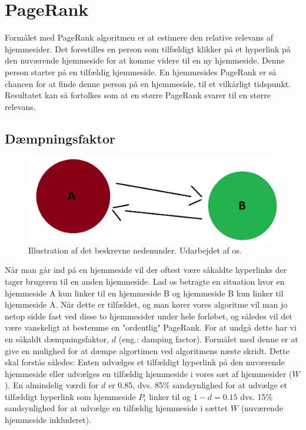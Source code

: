\section{PageRank}
Formålet med PageRank algoritmen er at estimere den relative relevans af hjemmesider. Det forestilles en person som tilfældigt klikker på et hyperlink på den nuværende hjemmeside for at komme videre til en ny hjemmeside. Denne person starter på en tilfældig hjemmeside. En hjemmesides PageRank er så chancen for at finde denne person på en hjemmeside, til et vilkårligt tidspunkt. Resultatet kan så fortolkes som at en større PageRank svarer til en større relevans.

\subsection*{Dæmpningsfaktor}
\begin{figure}[!h]
    \centering
    \includegraphics[width = \linewidth]{Billeder/damping_fac.png}
    \caption{Illustration af det beskrevne nedenunder. Udarbejdet af os.}
    \label{fig:my_label}
\end{figure}

Når man går ind på en hjemmeside vil der oftest være såkaldte hyperlinks der tager brugeren til en anden hjemmeside. Lad os betragte en situation hvor en hjemmeside A kun linker til en hjemmeside B og hjemmeside B kun linker til hjemmeside A. Når dette er tilfældet, og man kører vores algoritme vil man jo netop sidde fast ved disse to hjemmesider under hele forløbet, og således vil det være vanskeligt at bestemme en "ordentlig"  PageRank. For at undgå dette har vi en såkaldt dæmpningsfaktor, $d$ (eng.: damping factor). Formålet med denne er at give en mulighed for at dæmpe algortimen ved algoritmens næste skridt. Dette skal forstås således: Enten udvælges et tilfældigt hyperlink på den nuværende hjemmeside eller udvælges en tilfældig hjemmeside i vores sæt af hjemmesider ($W$). En almindelig værdi for $d$ er 0.85, dvs. 85\% sandsynlighed for at udvælge et tilfældigt hyperlink som hjemmeside $P_i$ linker til og $1 - d = 0.15$ dvs. 15\% sandsynlighed for at udvælge en tilfældig hjemmeside i sættet $W$ (nuværende hjemmeside inkluderet).

